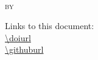 \begin{titlepage}
\begin{center}
\vspace{1.5cm}

\textsc{\Large ~}\\[1cm] %

%
{\huge \bfseries \ttitle\par}\vspace{1cm} %



\textsc{\Large by}\\[1cm]

{\Large \authorname}

\vspace{1.5cm}


\groupname%

\vfill

{\large \tdate} %

\vspace{0.25ex}

{\small \tversion}

\vspace{0.25ex}

{\small Links to this document:}\\
{\small \url{\doiurl}}\\
{\small \url{\githuburl}}

\vfill
\end{center}

\restoregeometry

\end{titlepage}



